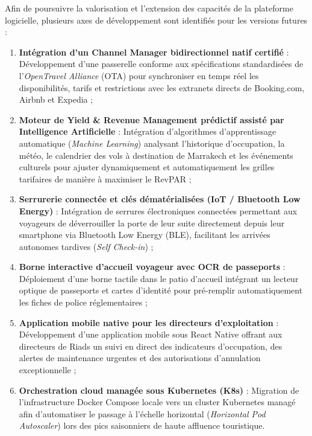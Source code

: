 \documentclass[12pt,a4paper,oneside]{report}
\begin{document}
Afin de poursuivre la valorisation et l'extension des capacités de la plateforme logicielle, plusieurs axes de développement sont identifiés pour les versions futures :

\begin{enumerate}
    \item \textbf{Intégration d'un Channel Manager bidirectionnel natif certifié} : Développement d'une passerelle conforme aux spécifications standardisées de l'\textit{OpenTravel Alliance} (OTA) pour synchroniser en temps réel les disponibilités, tarifs et restrictions avec les extranets directs de Booking.com, Airbnb et Expedia ;
    \item \textbf{Moteur de Yield \& Revenue Management prédictif assisté par Intelligence Artificielle} : Intégration d'algorithmes d'apprentissage automatique (\textit{Machine Learning}) analysant l'historique d'occupation, la météo, le calendrier des vols à destination de Marrakech et les événements culturels pour ajuster dynamiquement et automatiquement les grilles tarifaires de manière à maximiser le RevPAR ;
    \item \textbf{Serrurerie connectée et clés dématérialisées (IoT / Bluetooth Low Energy)} : Intégration de serrures électroniques connectées permettant aux voyageurs de déverrouiller la porte de leur suite directement depuis leur smartphone via Bluetooth Low Energy (BLE), facilitant les arrivées autonomes tardives (\textit{Self Check-in}) ;
    \item \textbf{Borne interactive d'accueil voyageur avec OCR de passeports} : Déploiement d'une borne tactile dans le patio d'accueil intégrant un lecteur optique de passeports et cartes d'identité pour pré-remplir automatiquement les fiches de police réglementaires ;
    \item \textbf{Application mobile native pour les directeurs d'exploitation} : Développement d'une application mobile sous React Native offrant aux directeurs de Riads un suivi en direct des indicateurs d'occupation, des alertes de maintenance urgentes et des autorisations d'annulation exceptionnelle ;
    \item \textbf{Orchestration cloud managée sous Kubernetes (K8s)} : Migration de l'infrastructure Docker Compose locale vers un cluster Kubernetes managé afin d'automatiser le passage à l'échelle horizontal (\textit{Horizontal Pod Autoscaler}) lors des pics saisonniers de haute affluence touristique.
\end{enumerate}

\clearpage
\end{document}
